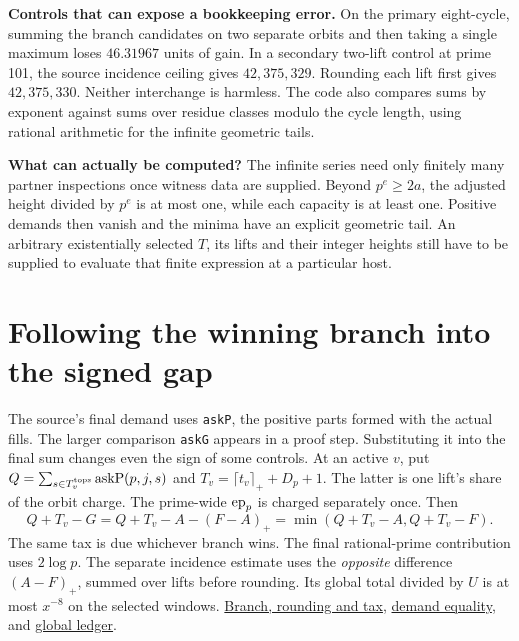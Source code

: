 \documentclass[12pt,letterpaper]{article}
\newcommand{\orig}[3]{\href{https://github.com/nousentllc/riemann-hypothesis/blob/40e56bab026552e089d7afcfeff08d2defb9c005/src/#1.lean\#L#2}{#3}}
\newcommand{\para}[1]{\par\medskip\noindent\textbf{#1}\quad}
\newcommand{\pagepart}[1]{\clearpage\section{#1}}
\begin{document}
\para{Controls that can expose a bookkeeping error.} On the primary eight-cycle, summing the branch candidates on two separate orbits and then taking a single maximum loses \(46.31967\) units of gain. In a secondary two-lift control at prime 101, the source incidence ceiling gives \(42{,}375{,}329\). Rounding each lift first gives \(42{,}375{,}330\). Neither interchange is harmless. The code also compares sums by exponent against sums over residue classes modulo the cycle length, using rational arithmetic for the infinite geometric tails.

\para{What can actually be computed?} The infinite series need only finitely many partner inspections once witness data are supplied. Beyond \(p^e\ge2a\), the adjusted height divided by \(p^e\) is at most one, while each capacity is at least one. Positive demands then vanish and the minima have an explicit geometric tail. An arbitrary existentially selected \(T\), its lifts and their integer heights still have to be supplied to evaluate that finite expression at a particular host.

\pagepart{Following the winning branch into the signed gap}
The source's final demand uses \texttt{askP}, the positive parts formed with the actual fills. The larger comparison \texttt{askG} appears in a proof step. Substituting it into the final sum changes even the sign of some controls. At an active \(v\), put \(Q=\sum_{s\in T_v^{\rm tops}}\mathrm{askP}(p,j,s)\) and \(T_v=\lceil t_v\rceil_++D_p+1\). The latter is one lift's share of the orbit charge. The prime-wide \({\rm ep}_p\) is charged separately once. Then
\[
 Q+T_v-G=Q+T_v-A-(F-A)_+
         =\min(Q+T_v-A,Q+T_v-F).
\]
The same tax is due whichever branch wins. The final rational-prime contribution uses \(2\log p\). The separate incidence estimate uses the \emph{opposite} difference \((A-F)_+\), summed over lifts before rounding. Its global total divided by \(U\) is at most \(x^{-8}\) on the selected windows. \orig{Formalism/SharpRestriction/GrowthBounds/IsResidueClassZero}{336}{Branch, rounding and tax}, \orig{Formalism/SharpRestriction/GrowthBounds/PlaneCountTheoremWithConstants}{223}{demand equality}, and \orig{Formalism/LocalToGlobal/GlobalTheory/PowFourLtCeilThresholdPrime}{386}{global ledger}.
\end{document}
